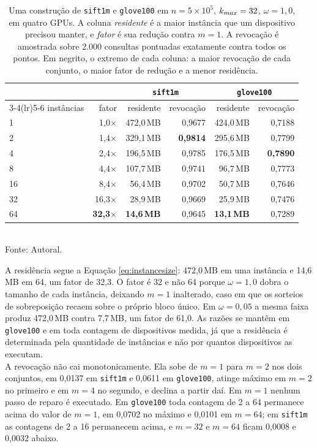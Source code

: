 \begin{table}[htb!]
\caption{\label{tab:memory} Uma construção de \texttt{sift1m} e \texttt{glove100} em $n = 5 \times 10^5$, $k_{max} = 32$, $\omega = 1{,}0$, em quatro \ac{GPU}s. A coluna \textit{residente} é a maior instância que um dispositivo precisou manter, e \textit{fator} é sua redução contra $m = 1$. A revocação é amostrada sobre 2.000 consultas pontuadas exatamente contra todos os pontos. Em negrito, o extremo de cada coluna: a maior revocação de cada conjunto, o maior fator de redução e a menor residência.}
\centering
\footnotesize
\begin{tabular}{@{}lrrrrr@{}}
\toprule
 & & \multicolumn{2}{c}{\texttt{sift1m}} & \multicolumn{2}{c}{\texttt{glove100}} \\
\cmidrule(lr){3-4}\cmidrule(lr){5-6}
instâncias & fator & residente & revocação & residente & revocação \\
\midrule
1  & 1,0$\times$  & 472,0\,MB & 0,9677 & 424,0\,MB & 0,7188 \\
2  & 1,4$\times$  & 329,1\,MB & \textbf{0,9814} & 295,6\,MB & 0,7799 \\
4  & 2,4$\times$  & 196,5\,MB & 0,9785 & 176,5\,MB & \textbf{0,7890} \\
8  & 4,4$\times$  & 107,7\,MB & 0,9741 & 96,7\,MB  & 0,7773 \\
16 & 8,4$\times$  & 56,4\,MB  & 0,9702 & 50,7\,MB  & 0,7646 \\
32 & 16,3$\times$ & 28,9\,MB  & 0,9669 & 25,9\,MB  & 0,7476 \\
64 & \textbf{32,3}$\times$ & \textbf{14,6\,MB} & 0,9645 & \textbf{13,1\,MB} & 0,7289 \\
\bottomrule
\end{tabular}\\
Fonte: Autoral.
\end{table}

A residência segue a Equação \eqref{eq:instancesize}: 472,0\,MB em uma instância e 14,6\,MB em 64, um fator de 32,3. O fator é 32 e não 64 porque $\omega = 1{,}0$ dobra o tamanho de cada instância, deixando $m = 1$ inalterado, caso em que os sorteios de sobreposição recaem sobre o próprio bloco único. Em $\omega = 0{,}05$ a mesma faixa produz 472,0\,MB contra 7,7\,MB, um fator de 61,0. As razões se mantêm em \texttt{glove100} e em toda contagem de dispositivos medida, já que a residência é determinada pela quantidade de instâncias e não por quantos dispositivos as executam.\\

A revocação não cai monotonicamente. Ela sobe de $m = 1$ para $m = 2$ nos dois conjuntos, em 0,0137 em \texttt{sift1m} e 0,0611 em \texttt{glove100}, atinge máximo em $m = 2$ no primeiro e em $m = 4$ no segundo, e declina a partir daí. Em $m = 1$ nenhum passo de reparo é executado. Em \texttt{glove100} toda contagem de 2 a 64 permanece acima do valor de $m = 1$, em 0,0702 no máximo e 0,0101 em $m = 64$; em \texttt{sift1m} as contagens de 2 a 16 permanecem acima, e $m = 32$ e $m = 64$ ficam 0,0008 e 0,0032 abaixo.\\

